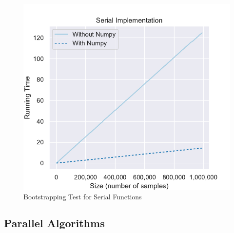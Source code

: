\documentclass[11pt]{article}
\begin{document}
\begin{figure}[H]
    \begin{center}
        \includegraphics{serial_test.pdf}
    \end{center}
    \caption{Bootstrapping Test for Serial Functions}\label{fig:SerialTest}
\end{figure}

\subsection{Parallel Algorithms}\label{subsec:parallel-algorithms}



\printbibliography
\end{document}
